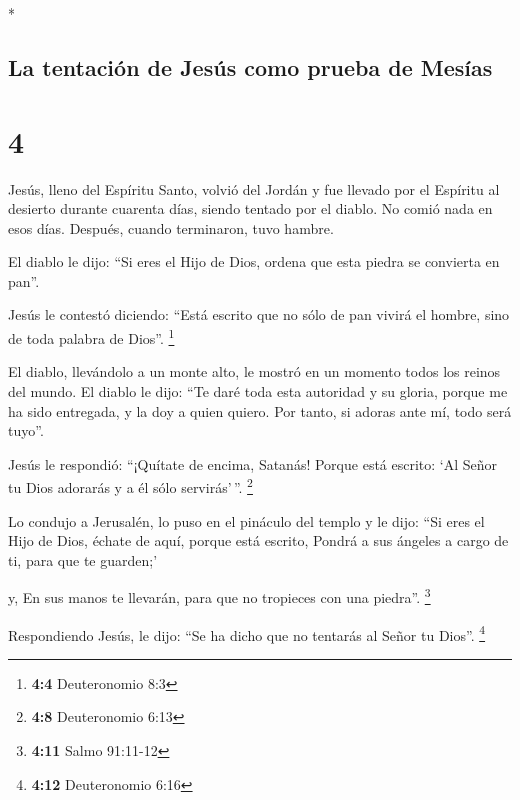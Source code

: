 \begin{paracol}{2}
\begin{otherlanguage}{english}
\end{otherlanguage}

\switchcolumn[0]*

\hypertarget{la-tentaciuxf3n-de-jesuxfas-como-prueba-de-mesuxedas}{%
\subsection{La tentación de Jesús como prueba de
Mesías}\label{la-tentaciuxf3n-de-jesuxfas-como-prueba-de-mesuxedas}}

\hypertarget{section-6}{%
\section{4}\label{section-6}}

 Jesús, lleno del Espíritu Santo, volvió del Jordán y fue
llevado por el Espíritu al desierto  durante cuarenta
días, siendo tentado por el diablo. No comió nada en esos días. Después,
cuando terminaron, tuvo hambre.

 El diablo le dijo: ``Si eres el Hijo de Dios, ordena que
esta piedra se convierta en pan''.

 Jesús le contestó diciendo: ``Está escrito que no sólo de
pan vivirá el hombre, sino de toda palabra de Dios''. \footnote{\textbf{4:4}
  Deuteronomio 8:3}

 El diablo, llevándolo a un monte alto, le mostró en un
momento todos los reinos del mundo.  El diablo le dijo:
``Te daré toda esta autoridad y su gloria, porque me ha sido entregada,
y la doy a quien quiero.  Por tanto, si adoras ante mí,
todo será tuyo''.

 Jesús le respondió: ``¡Quítate de encima, Satanás! Porque
está escrito: `Al Señor tu Dios adorarás y a él sólo servirás'\,''.
\footnote{\textbf{4:8} Deuteronomio 6:13}

 Lo condujo a Jerusalén, lo puso en el pináculo del templo
y le dijo: ``Si eres el Hijo de Dios, échate de aquí, 
porque está escrito, Pondrá a sus ángeles a cargo de ti, para que te
guarden;'

 y, En sus manos te llevarán, para que no tropieces con
una piedra''. \footnote{\textbf{4:11} Salmo 91:11-12}

 Respondiendo Jesús, le dijo: ``Se ha dicho que no
tentarás al Señor tu Dios''. \footnote{\textbf{4:12} Deuteronomio 6:16}


\end{paracol}
